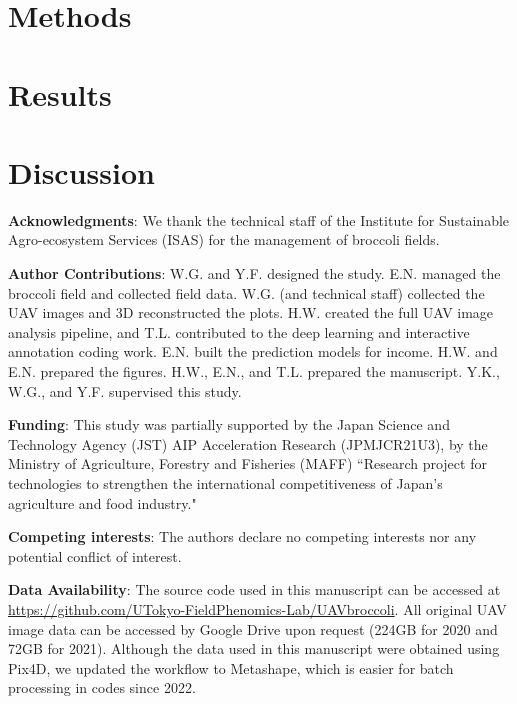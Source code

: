 \section{Methods}


\section{Results}


\section{Discussion}



\noindent \textbf{Acknowledgments}: We thank the technical staff of the Institute for Sustainable Agro-ecosystem Services (ISAS) for the management of broccoli fields. 

\hspace*{\fill}

\noindent \textbf{Author Contributions}: W.G. and Y.F. designed the study. E.N. managed the broccoli field and collected field data. W.G. (and technical staff) collected the UAV images and 3D reconstructed the plots. H.W. created the full UAV image analysis pipeline, and T.L. contributed to the deep learning and interactive annotation coding work. E.N. built the prediction models for income. H.W. and E.N. prepared the figures. H.W., E.N., and T.L. prepared the manuscript. Y.K., W.G., and Y.F. supervised this study.

\hspace*{\fill}

\noindent \textbf{Funding}: This study was partially supported by the Japan Science and Technology Agency (JST) AIP Acceleration Research (JPMJCR21U3), by the Ministry of Agriculture, Forestry and Fisheries (MAFF) ``Research project for technologies to strengthen the international competitiveness of Japan's agriculture and food industry."

\hspace*{\fill}

\noindent \textbf{Competing interests}: The authors declare no competing interests nor any potential conflict of interest.

\hspace*{\fill}

\noindent \textbf{Data Availability}: The source code used in this manuscript can be accessed at \url{https://github.com/UTokyo-FieldPhenomics-Lab/UAVbroccoli}. All original UAV image data can be accessed by Google Drive upon request (224GB for 2020 and 72GB for 2021). Although the data used in this manuscript were obtained using Pix4D, we updated the workflow to Metashape, which is easier for batch processing in codes since 2022.


